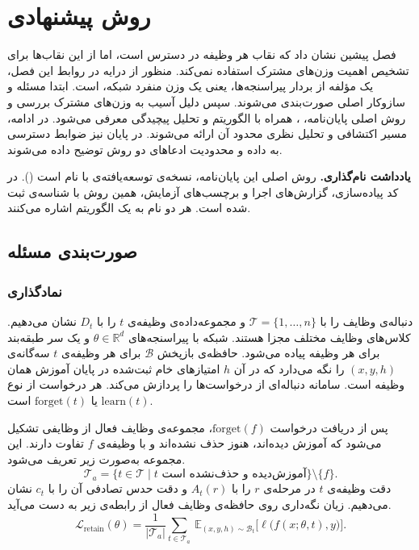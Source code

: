 
\chapter{روش پیشنهادی}
\label{ch:proposed}

فصل پیشین نشان داد که نقاب هر وظیفه در دسترس است، اما  از این نقاب‌ها برای تشخیص اهمیت وزن‌های مشترک استفاده نمی‌کند. منظور از درایه در روابط این فصل، یک مؤلفه از بردار پیراسنجه‌ها، یعنی یک وزن منفرد شبکه، است. ابتدا مسئله و سازوکار اصلی  صورت‌بندی می‌شوند. سپس دلیل آسیب به وزن‌های مشترک بررسی و روش اصلی پایان‌نامه، ، همراه با الگوریتم و تحلیل پیچیدگی معرفی می‌شود. در ادامه، مسیر اکتشافی  و تحلیل نظری محدود آن ارائه می‌شوند. در پایان نیز ضوابط دسترسی به داده و محدودیت ادعاهای دو روش توضیح داده می‌شوند.

\medskip
\noindent\textbf{یادداشت نام‌گذاری.} روش اصلی این پایان‌نامه، نسخه‌ی توسعه‌یافته‌ی  با نام  است (). در کد پیاده‌سازی، گزارش‌های اجرا و برچسب‌های آزمایش، همین روش با شناسه‌ی  ثبت شده است. هر دو نام به یک الگوریتم اشاره می‌کنند.

\section{صورت‌بندی مسئله}
\label{sec:prop-formulation}

\subsection{نمادگذاری}
\label{subsec:prop-notation}

دنباله‌ی وظایف را با $\mathcal{T}=\{1,\ldots,n\}$ و مجموعه‌داده‌ی وظیفه‌ی $t$ را با $D_t$ نشان می‌دهیم. کلاس‌های وظایف مختلف مجزا هستند. شبکه با پیراسنجه‌های $\theta\in\mathbb{R}^{d}$ و یک سر طبقه‌بند برای هر وظیفه پیاده می‌شود. حافظه‌ی بازپخش $\mathcal{B}$ برای هر وظیفه‌ی $t$ سه‌گانه‌ی $(x,y,h)$ را نگه می‌دارد که در آن $h$ امتیازهای خام ثبت‌شده در پایان آموزش همان وظیفه است. سامانه دنباله‌ای از درخواست‌ها را پردازش می‌کند. هر درخواست از نوع $\mathrm{learn}(t)$ یا $\mathrm{forget}(t)$ است.

پس از دریافت درخواست $\mathrm{forget}(f)$، مجموعه‌ی وظایف فعال از وظایفی تشکیل می‌شود که آموزش دیده‌اند، هنوز حذف نشده‌اند و با وظیفه‌ی $f$ تفاوت دارند. این مجموعه به‌صورت زیر تعریف می‌شود.
\[
	\mathcal{T}_a=\bigl\{t\in\mathcal{T}\mid t \text{ آموزش‌دیده و حذف‌نشده است}\bigr\}\setminus\{f\}.
\]
دقت وظیفه‌ی $t$ در مرحله‌ی $r$ را با $A_t(r)$ و دقت حدس تصادفی آن را با $c_t$ نشان می‌دهیم. زیان نگه‌داری روی حافظه‌ی وظایف فعال از رابطه‌ی زیر به دست می‌آید.
\begin{equation}
	\label{eq:retain-loss}
	\mathcal{L}_{\mathrm{retain}}(\theta)=\frac{1}{|\mathcal{T}_a|}\sum_{t\in\mathcal{T}_a}\ \mathbb{E}_{(x,y,h)\sim\mathcal{B}_t}\Big[\ell\big(f(x;\theta,t),y\big)\Big].
\end{equation}

